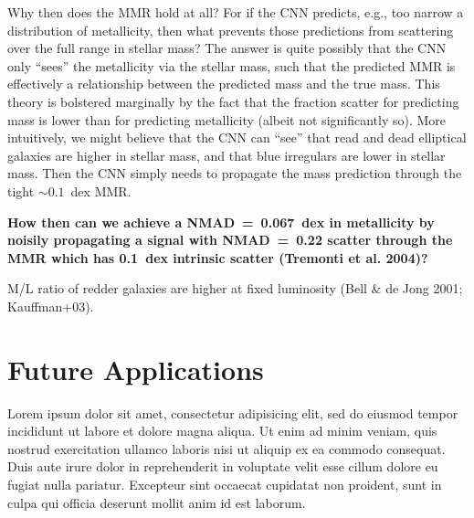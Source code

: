\documentclass[fleqn,usenatbib]{mnras}
\begin{document}
Why then does the MMR hold at all?
For if the CNN predicts, e.g., too narrow a distribution of metallicity, then what prevents those predictions from scattering over the full range in stellar mass?
The answer is quite possibly that the CNN only ``sees'' the metallicity via the stellar mass, such that the predicted MMR is effectively a relationship between the predicted mass and the true mass.
This theory is bolstered marginally by the fact that the fraction scatter for predicting mass is lower than for predicting metallicity (albeit not significantly so).
More intuitively, we might believe that the CNN can ``see'' that read and dead elliptical galaxies are higher in stellar mass, and that blue irregulars are lower in stellar mass.
Then the CNN simply needs to propagate the mass prediction through the tight $\sim 0.1$~dex MMR.

\textbf{How then can we achieve a NMAD~=~0.067~dex in metallicity by noisily propagating a signal with NMAD~=~0.22 scatter through the MMR which has 0.1~dex intrinsic scatter (Tremonti et al. 2004)?}

M/L ratio of redder galaxies are higher at fixed luminosity (Bell \& de Jong 2001; Kauffman+03).







\section{Future Applications}\label{sec:future}
Lorem ipsum dolor sit amet, consectetur adipisicing elit, sed do eiusmod tempor incididunt ut labore et dolore magna aliqua. Ut enim ad minim veniam, quis nostrud exercitation ullamco laboris nisi ut aliquip ex ea commodo consequat. Duis aute irure dolor in reprehenderit in voluptate velit esse cillum dolore eu fugiat nulla pariatur. Excepteur sint occaecat cupidatat non proident, sunt in culpa qui officia deserunt mollit anim id est laborum.
\end{document}
